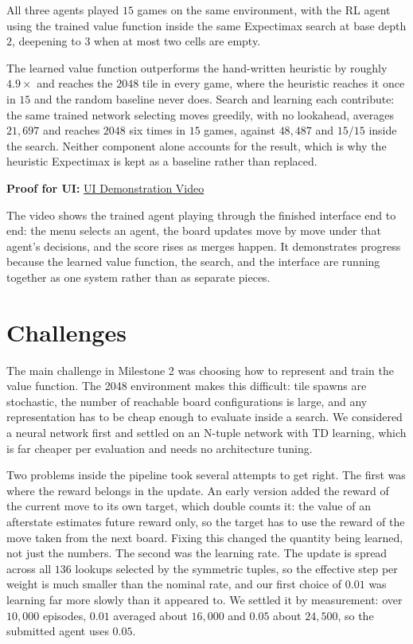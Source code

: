 \documentclass[11pt]{article}
\begin{document}
All three agents played $15$ games on the same environment, with the RL agent using the trained value function inside the same Expectimax search at base depth $2$, deepening to $3$ when at most two cells are empty.

The learned value function outperforms the hand-written heuristic by roughly $4.9\times$ and reaches the $2048$ tile in every game, where the heuristic reaches it once in $15$ and the random baseline never does. Search and learning each contribute: the same trained network selecting moves greedily, with no lookahead, averages $21{,}697$ and reaches $2048$ six times in $15$ games, against $48{,}487$ and $15/15$ inside the search. Neither component alone accounts for the result, which is why the heuristic Expectimax is kept as a baseline rather than replaced.

\textbf{Proof for UI:} \href{https://drive.google.com/file/d/1-gKNcE1lnj2mgyTqu5JZMDWHQt1NOJ9a/view?usp=sharing}{UI Demonstration Video}

The video shows the trained agent playing through the finished interface end to end: the menu selects an agent, the board updates move by move under that agent's decisions, and the score rises as merges happen. It demonstrates progress because the learned value function, the search, and the interface are running together as one system rather than as separate pieces.

\section*{Challenges}

The main challenge in Milestone 2 was choosing how to represent and train the value function. The 2048 environment makes this difficult: tile spawns are stochastic, the number of reachable board configurations is large, and any representation has to be cheap enough to evaluate inside a search. We considered a neural network first and settled on an N-tuple network with TD learning, which is far cheaper per evaluation and needs no architecture tuning.

Two problems inside the pipeline took several attempts to get right. The first was where the reward belongs in the update. An early version added the reward of the current move to its own target, which double counts it: the value of an afterstate estimates future reward only, so the target has to use the reward of the move taken from the next board. Fixing this changed the quantity being learned, not just the numbers. The second was the learning rate. The update is spread across all $136$ lookups selected by the symmetric tuples, so the effective step per weight is much smaller than the nominal rate, and our first choice of $0.01$ was learning far more slowly than it appeared to. We settled it by measurement: over $10{,}000$ episodes, $0.01$ averaged about $16{,}000$ and $0.05$ about $24{,}500$, so the submitted agent uses $0.05$.
\end{document}
